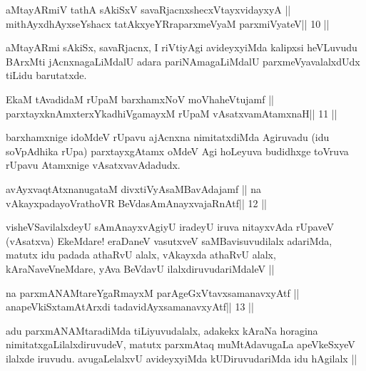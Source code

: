 

\begin{shl}
aMtayARmiV tathA sAkiSxV savaRjacnxshecxVtayxvidayxyA ||
mithAyxdhAyxseYshacx tatAkxyeYRraparxmeVyaM parxmiVyateV\hfill || 10 ||
\end{shl}

\begin{artha}
aMtayARmi sAkiSx, savaRjacnx, I riVtiyAgi avideyxyiMda kalipxsi
heVLuvudu BArxMti jAcnxnagaLiMdalU adara pariNAmagaLiMdalU
parxmeVyavalalxdUdx tiLidu barutatxde.
\end{artha}

\begin{shl}
EkaM tAvadidaM rUpaM barxhamxNoV moVhaheVtujamf ||
parxtayxknAmxterxYkadhiVgamayxM rUpaM vAsatxvamAtamxnaH\hfill || 11 ||
\end{shl}

\begin{artha}
barxhamxnige idoMdeV rUpavu ajAcnxna nimitatxdiMda Agiruvadu (idu
soVpAdhika rUpa) parxtayxgAtamx oMdeV Agi hoLeyuva budidhxge toVruva
rUpavu Atamxnige vAsatxvavAdadudx.
\end{artha}

\begin{shl}
avAyxvaqtAtxnanugataM divxtiVyAsaMBavAdajamf ||
na vAkayxpadayoVrathoVR BeVdasAmAnayxvajaRnAtf\hfill || 12 ||
\end{shl}

\begin{artha}
visheVSavilalxdeyU sAmAnayxvAgiyU iradeyU iruva nitayxvAda rUpaveV
(vAsatxva) EkeMdare! eraDaneV vasutxveV saMBavisuvudilalx adariMda,
matutx idu padada athaRvU alalx, vAkayxda athaRvU alalx,
kAraNaveVneMdare, yAva BeVdavU ilalxdiruvudariMdaleV ||
\end{artha}

\begin{shl}
na parxmANAMtareYgaRmayxM parAgeGxVtavxsamanavxyAtf ||
anapeVkiSxtamAtArxdi tadavidAyxsamanavxyAtf\hfill || 13 ||
\end{shl}

\begin{artha}
adu parxmANAMtaradiMda tiLiyuvudalalx, adakekx kAraNa horagina
nimitatxgaLilalxdiruvudeV, matutx parxmAtaq muMtAdavugaLa apeVkeSxyeV
ilalxde iruvudu. avugaLelalxvU avideyxyiMda kUDiruvudariMda idu
hAgilalx ||
\end{artha}



